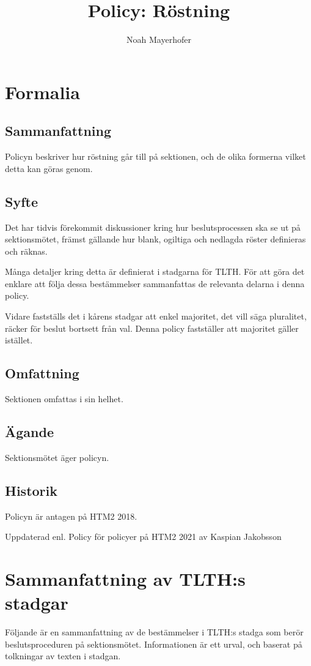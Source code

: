 \documentclass{dsekprotokoll}
\title{Policy: Röstning}
\author{Noah Mayerhofer}
\begin{document}
\maketitle
\section{Formalia}
\subsection{Sammanfattning}
Policyn beskriver hur röstning går till på sektionen, och de olika formerna vilket detta kan göras genom.
\subsection{Syfte}
Det har tidvis förekommit diskussioner kring hur beslutsprocessen ska se ut på sektionsmötet,
främst gällande hur blank, ogiltiga och nedlagda röster definieras och räknas.


Många detaljer kring detta är definierat i stadgarna för TLTH. För att göra det enklare att följa
dessa bestämmelser sammanfattas de relevanta delarna i denna policy.


Vidare fastställs det i kårens stadgar att enkel majoritet, det vill säga pluralitet, räcker för beslut
bortsett från val. Denna policy fastställer att majoritet gäller istället.

\subsection{Omfattning}
Sektionen omfattas i sin helhet.

\subsection{Ägande}
Sektionsmötet äger policyn.

\subsection{Historik}
Policyn är antagen på HTM2 2018.

Uppdaterad enl. Policy för policyer på HTM2 2021 av Kaspian Jakobsson


\section{Sammanfattning av TLTH:s stadgar}
Följande är en sammanfattning av de bestämmelser i TLTH:s stadga som berör beslutsproceduren på sektionsmötet. Informationen är ett urval, och baserat på tolkningar av texten i stadgan.
\end{document}
